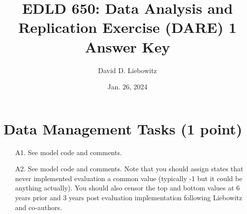 \documentclass[a4paper, 11pt]{article}
\title{EDLD 650: Data Analysis and Replication Exercise (DARE) 1
Answer Key}
\author{David D. Liebowitz}
\date{Jan. 26, 2024}
\begin{document}
\maketitle

\section{Data Management Tasks (1 point)}
\begin{enumerate}
	\item[A1.] See model code and comments.
	\item[A2.] See model code and comments. Note that you should assign states that never implemented evaluation a common value (typically -1 but it could be anything actually). You should also censor the top and bottom values at 6 years prior and 3 years post evaluation implementation following Liebowitz and co-authors.
\end{enumerate}
\end{document}
